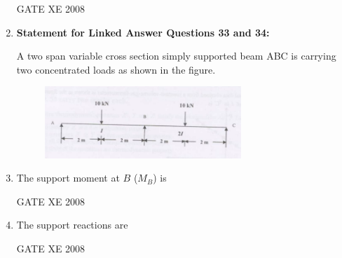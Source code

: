 \documentclass[12pt]{article}
\begin{document}
\begin{enumerate}
GATE XE 2008

\item[] \textbf{Statement for Linked Answer Questions 33 and 34:}  

A two span variable cross section simply supported beam ABC is carrying two concentrated loads as shown in the figure.

    \begin{figure}[H]
    \centering
    \includegraphics[width=0.7\textwidth]{figs/ass1_f_q33.png}
    \caption{}
    \end{figure}

\item The support moment at $B$ ($M_B$) is  

\begin{enumerate}
\end{enumerate}

GATE XE 2008


\item The support reactions are  

\begin{enumerate}
\end{enumerate}

GATE XE 2008


\end{enumerate}
\end{document}
